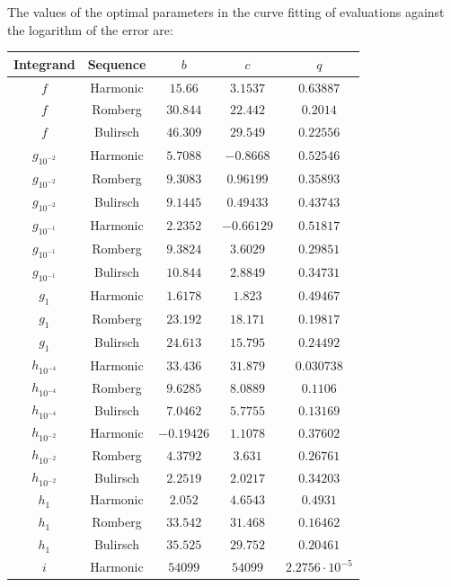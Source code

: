 The values of the optimal parameters in the curve fitting of evaluations against the logarithm of the error are:

\begin{table}[H]
    \centering
    \begin{tabular}{c|c||c|c|c}
        Integrand & Sequence & \(b\) & \(c\) & \(q\) \\\hline\hline
$f$ & Harmonic & \(15.66\) & \(3.1537\) & \(0.63887\) \\
$f$ & Romberg & \(30.844\) & \(22.442\) & \(0.2014\) \\
$f$ & Bulirsch & \(46.309\) & \(29.549\) & \(0.22556\) \\
$g_{10^{-2}}$ & Harmonic & \(5.7088\) & \(-0.8668\) & \(0.52546\) \\
$g_{10^{-2}}$ & Romberg & \(9.3083\) & \(0.96199\) & \(0.35893\) \\
$g_{10^{-2}}$ & Bulirsch & \(9.1445\) & \(0.49433\) & \(0.43743\) \\
$g_{10^{-1}}$ & Harmonic & \(2.2352\) & \(-0.66129\) & \(0.51817\) \\
$g_{10^{-1}}$ & Romberg & \(9.3824\) & \(3.6029\) & \(0.29851\) \\
$g_{10^{-1}}$ & Bulirsch & \(10.844\) & \(2.8849\) & \(0.34731\) \\
$g_1$ & Harmonic & \(1.6178\) & \(1.823\) & \(0.49467\) \\
$g_1$ & Romberg & \(23.192\) & \(18.171\) & \(0.19817\) \\
$g_1$ & Bulirsch & \(24.613\) & \(15.795\) & \(0.24492\) \\
$h_{10^{-4}}$ & Harmonic & \(33.436\) & \(31.879\) & \(0.030738\) \\
$h_{10^{-4}}$ & Romberg & \(9.6285\) & \(8.0889\) & \(0.1106\) \\
$h_{10^{-4}}$ & Bulirsch & \(7.0462\) & \(5.7755\) & \(0.13169\) \\
$h_{10^{-2}}$ & Harmonic & \(-0.19426\) & \(1.1078\) & \(0.37602\) \\
$h_{10^{-2}}$ & Romberg & \(4.3792\) & \(3.631\) & \(0.26761\) \\
$h_{10^{-2}}$ & Bulirsch & \(2.2519\) & \(2.0217\) & \(0.34203\) \\
$h_1$ & Harmonic & \(2.052\) & \(4.6543\) & \(0.4931\) \\
$h_1$ & Romberg & \(33.542\) & \(31.468\) & \(0.16462\) \\
$h_1$ & Bulirsch & \(35.525\) & \(29.752\) & \(0.20461\) \\
$i$ & Harmonic & \(54099\) & \(54099\) & \(2.2756\cdot 10^{-5}\) \\

\end{tabular}
\end{table}
